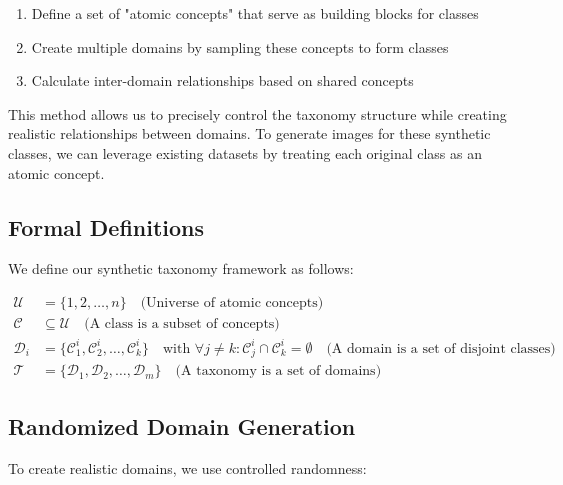 \begin{enumerate}
    \item Define a set of "atomic concepts" that serve as building blocks for classes
    \item Create multiple domains by sampling these concepts to form classes
    \item Calculate inter-domain relationships based on shared concepts
\end{enumerate}

This method allows us to precisely control the taxonomy structure while creating realistic relationships between domains. To generate images for these synthetic classes, we can leverage existing datasets by treating each original class as an atomic concept.

\subsection{Formal Definitions}

We define our synthetic taxonomy framework as follows:

\begin{equation}
    \begin{aligned}
        \mathcal{U}   & = \{1, 2, \ldots, n\} \quad \text{(Universe of atomic concepts)}                                                                                                                                           \\
        \mathcal{C}   & \subseteq \mathcal{U} \quad \text{(A class is a subset of concepts)}                                                                                                                                       \\
        \mathcal{D}_i & = \{\mathcal{C}_1^i, \mathcal{C}_2^i, \ldots, \mathcal{C}_k^i\} \quad \text{with } \forall j \neq k: \mathcal{C}_j^i \cap \mathcal{C}_k^i = \emptyset \quad \text{(A domain is a set of disjoint classes)} \\
        \mathcal{T}   & = \{\mathcal{D}_1, \mathcal{D}_2, \ldots, \mathcal{D}_m\} \quad \text{(A taxonomy is a set of domains)}
    \end{aligned}
\end{equation}

\subsection{Randomized Domain Generation}

To create realistic domains, we use controlled randomness:

